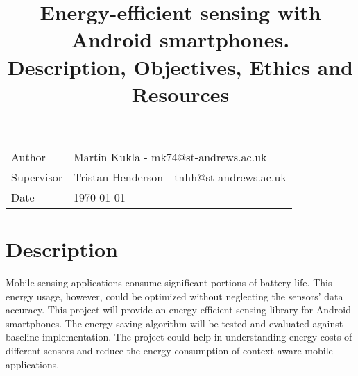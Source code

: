 \documentclass[a4page]{article}
\title{Energy-efficient sensing with Android smartphones. \\ 
\large Description, Objectives, Ethics and Resources}
\date{}
\begin{document}
\maketitle

\begin{table}[!th]
\begin{tabular}{l p{}}
Author & Martin Kukla - mk74@st-andrews.ac.uk \\
Supervisor & Tristan Henderson - tnhh@st-andrews.ac.uk \\
Date & {\today}
\end{tabular}
\end{table}

\section{Description}
Mobile-sensing applications consume significant portions of battery life. This energy usage, however, could be optimized without neglecting the sensors' data accuracy. This project will 
provide an energy-efficient sensing library for Android smartphones. The energy saving algorithm will be tested and evaluated against baseline implementation. The project could help in understanding energy costs of different sensors and reduce the energy consumption of context-aware mobile applications.
\end{document}
